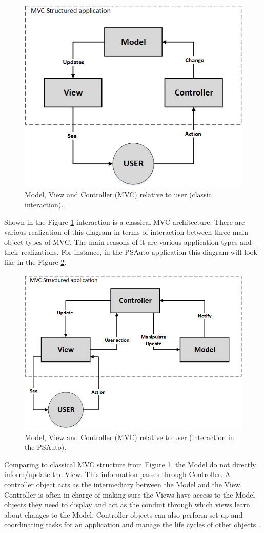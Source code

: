 \begin{figure}[ht]\centering
\includegraphics[width=0.7\linewidth]{Data/Control_Software/MVC_general.png}
\caption{Model, View and Controller (MVC) relative to user (classic interaction).}
\label{fig:mvc_general}
\end{figure}

Shown in the Figure \ref{fig:mvc_general} interaction is a classical MVC architecture. There are various realization of this diagram in terms of interaction between three main object types of MVC. The main reasons of it are various application types and their realizations. For instance, in the PSAuto application this diagram will look like in the Figure \ref{fig:mvc_custom}.

\begin{figure}[ht]\centering
\includegraphics[width=0.7\linewidth]{Data/Control_Software/MVC_custom.png}
\caption{Model, View and Controller (MVC) relative to user (interaction in the PSAuto).}
\label{fig:mvc_custom}
\end{figure}

Comparing to classical MVC structure from Figure \ref{fig:mvc_general}, the Model do not directly inform/update the View. This information passes through Controller. A controller object acts as the intermediary between the Model and the View. Controller is often in charge of making sure the Views have access to the Model objects they need to display and act as the conduit through which views learn about changes to the Model. Controller objects can also perform set-up and coordinating tasks for an application and manage the life cycles of other objects \cite{apple_MVC}.

